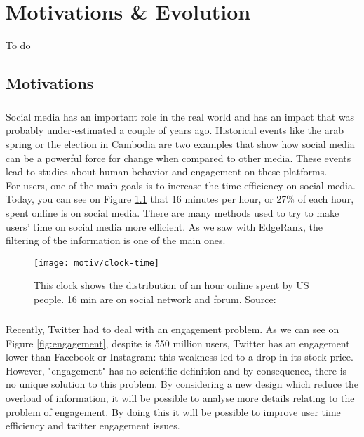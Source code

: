 \chapter{Motivations \& Evolution}
To do

\section{Motivations}
\paragraph{}
Social media has an important role in the real world and has an impact that was probably under-estimated a couple of years ago. Historical events like the arab spring or the election in Cambodia \cite{f_cambodia} are two examples that show how social media can be a powerful force for change when compared to other media. These events lead to studies about human behavior and engagement on these platforms.\\
For users, one of the main goals is to increase the time efficiency on social media. Today, you can see on Figure \ref{fig:clock} that 16 minutes per hour, or 27\% of each hour, spent online is on social media. There are many methods used to try to make users' time on social media more efficient.  As we saw with EdgeRank, the filtering of the information is one of the main ones. \\

\begin{figure}[h] 
\centering 
\texttt{[image: motiv/clock-time]} 
\caption[Time spent of Social Media]{This clock shows the distribution of an hour online spent by US people. 16 min are on social network and forum. Source: \cite{s_clock}}
\label{fig:clock} 
\end{figure}

\paragraph{}
Recently, Twitter had to deal with an engagement problem. As we can see on Figure \ref{fig:engagement}, despite is 550 million users, Twitter has an engagement lower than Facebook or Instagram: this weakness led to  a drop in its stock price. However, "engagement" has no scientific definition and by consequence, there is no unique solution to this problem. By considering a new design which reduce the overload of information, it will be possible to analyse more details relating to the problem of engagement. By doing this it will be possible to improve user time efficiency and twitter engagement issues. \\

